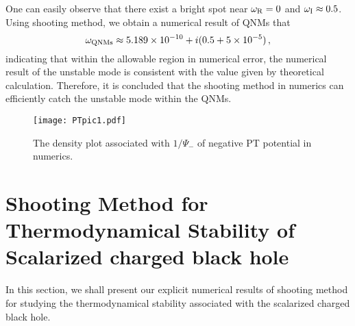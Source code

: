 \documentclass[pr, twocolumn, preprintnumbers, showpacs,footnoteadded, superscriptaddress,nofootinbib,longbibliography]{revtex4-1}
\begin{document}
One can easily observe that there exist a bright spot near $\omega_{\rm R}=0$ and $\omega_{\rm I} \approx 0.5$. Using shooting method, we obtain a numerical result of QNMs that
%
\begin{equation}
\omega_{\rm QNMs}\approx 5.189 \times 10^{-10} + i(0.5 + 5 \times 10^{-5}) \, ,
\end{equation}
%
indicating that within the allowable region in numerical error, the numerical result of the unstable mode is consistent with the value given by theoretical calculation. Therefore, it is concluded that the shooting method in numerics can efficiently catch the unstable mode within the QNMs.

%
\begin{figure}[hbpt]
  \centering
  \texttt{[image: PTpic1.pdf]}
  \caption{The density plot associated with $1/\Psi_-$ of negative PT potential in numerics.}\label{PTpic}
\end{figure}
%


\section{Shooting Method for Thermodynamical Stability of Scalarized charged black hole}\label{numapp}
In this section, we shall present our explicit numerical results of shooting method for studying the thermodynamical stability associated with the scalarized charged black hole.
\end{document}
